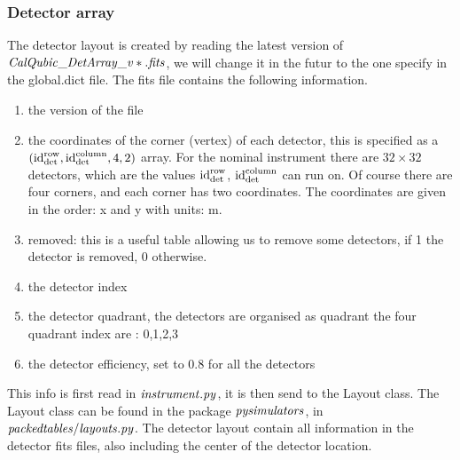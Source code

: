 \documentclass[a4paper, 11pt]{article}
\begin{document}
\subsubsection{ Detector array}

The detector layout is created by reading the latest version of  $\it{CalQubic\_DetArray\_v*.fits}$, we will change it in the futur to the one specify in the global.dict file.
The fits file contains the following information.
\begin{enumerate}
\item the version of the file
\item the coordinates of the corner (vertex) of each detector, this is specified as a $({\rm id}^{\rm row}_{\rm det},{\rm id}^{\rm column}_{\rm det} ,4,2)$ array. For the nominal instrument there are $32 \times 32 $ detectors, which are the values ${\rm id}^{\rm row}_{\rm det}$, ${\rm id}^{\rm column}_{\rm det}$ can run on. Of course there are four corners, and each corner has two coordinates.
The coordinates are given in the order: x and y with units: m.
\item removed: this is a useful table allowing us to remove some detectors, if 1 the detector is removed, 0 otherwise.
\item the detector index
\item the detector quadrant, the detectors are organised as quadrant the four quadrant index are : 0,1,2,3
\item the detector efficiency, set to 0.8 for all the detectors
\end{enumerate}
This info is first read in $\it{instrument.py}$, it is then send to the Layout class.
The Layout class can be found in the package $\it{pysimulators}$, in $\it{packedtables/layouts.py}$.
The detector layout contain all information in the detector fits files, also including the center of the detector location. \\
\end{document}
